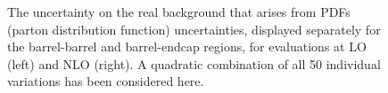 




\begin{figure}[!htbp]{ 
\caption{The uncertainty on the real \gmgm background that arises from PDFs (parton distribution function) uncertainties, displayed separately for the barrel-barrel and barrel-endcap regions, for evaluations at LO (left) and NLO (right). 
A quadratic combination of all 50 individual variations has been considered here.} 
\label{Fig:sys_pdf} }
\end{figure}


